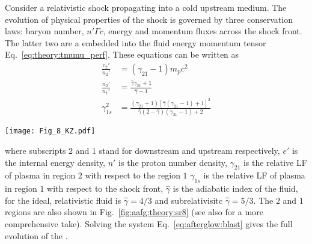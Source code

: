 Consider a relativistic shock propagating into a cold upstream medium.
The evolution of physical properties of the shock is governed by three conservation
laws: baryon number, $n' \Gamma c$, energy and momentum fluxes across the shock front.
The latter two are a embedded into the fluid energy momentum tensor 
Eq.~\eqref{eq:theory:tmunu_perf}.
%
%
These equations can be written as 
%
\begin{equation} %
    \begin{aligned} %
    \frac{e_2'}{n_2'} &= (\gamma_{21} - 1)m_p c^2 \\
    \frac{n_2'}{n_1'} &= \frac{\hat{\gamma}\gamma_{21} + 1}{\hat{\gamma}-1} \\
    \gamma_{1s}^2 &= \frac{(\gamma_{21} + 1) [\hat{\gamma}(\gamma_{21}-1)+1]^2}{\hat{\gamma}(2-\hat{\gamma})(\gamma_{21}-1)+2}
    \end{aligned} %
    \label{eq:afterglow:blast}
\end{equation} %
%
\begin{figure*}[t]
    \centering 
    \texttt{[image: Fig\_8\_KZ.pdf]}
    \caption{
        This is a schematic sketch of a pair of shocks produced when a relativistic
        jet from a \ac{GRB} collides with the \ac{CBM}, as viewed from the
        rest frame of unshocked \ac{CBM}. Regions 2 \& 3 represent shocked \ac{CBM} and \ac{GRB}
        jet respectively. They move together with the same \ac{LF} ($\gamma_2$, as viewed
        by a stationary observer in the unshocked \ac{CBM}), and have the same pressure but
        different densities.
        (Adapted from \citet{Kumar:2014upa}, figure~8)
    }
    \label{fig:aafg:theory:sr8}
\end{figure*}
%
where subscripts $2$ and $1$ stand for downstream and upstream respectively, 
$e'$ is the internal energy density, $n'$ is the proton number density, 
$\gamma_{21}$ is the relative \ac{LF} of plasma in region 
$2$ with respect to the region $1$
$\gamma_{1s}$ is the relative \ac{LF} of plasma in region $1$ with respect to the shock front,
$\hat{\gamma}$ is the adiabatic index of the fluid, for the ideal, relativistic 
fluid is $\hat{\gamma}=4/3$ and subrelativisitc $\hat{\gamma}=5/3$.
The $2$ and $1$ regions are also shown in Fig.~\ref{fig:aafg:theory:sr8} 
(see also \cite{Nava:2013} for a more comprehensive take).
%
Solving the system Eq.~\eqref{eq:afterglow:blast} gives the full evolution 
of the \blast{}. 


